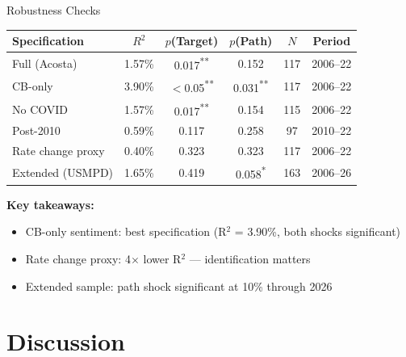 \documentclass[aspectratio=169, 11pt]{beamer}
\begin{document}
\begin{frame}{Robustness Checks}
\begin{tabular}{lccccc}
\toprule
Specification & $R^2$ & $p$(Target) & $p$(Path) & $N$ & Period \\
\midrule
Full (Acosta) & 1.57\% & 0.017\textsuperscript{**} & 0.152 & 117 & 2006--22 \\
CB-only & 3.90\% & $<$0.05\textsuperscript{**} & 0.031\textsuperscript{**} & 117 & 2006--22 \\
No COVID & 1.57\% & 0.017\textsuperscript{**} & 0.154 & 115 & 2006--22 \\
Post-2010 & 0.59\% & 0.117 & 0.258 & 97 & 2010--22 \\
Rate change proxy & 0.40\% & 0.323 & 0.323 & 117 & 2006--22 \\
Extended (USMPD) & 1.65\% & 0.419 & 0.058\textsuperscript{*} & 163 & 2006--26 \\
\bottomrule
\end{tabular}

\vspace{0.8em}
\textbf{Key takeaways:}
\begin{itemize}
  \item CB-only sentiment: best specification (R$^2$ = 3.90\%, both shocks significant)
  \item Rate change proxy: 4$\times$ lower R$^2$ --- identification matters
  \item Extended sample: path shock significant at 10\% through 2026
\end{itemize}
\end{frame}

\section{Discussion}
\end{document}
